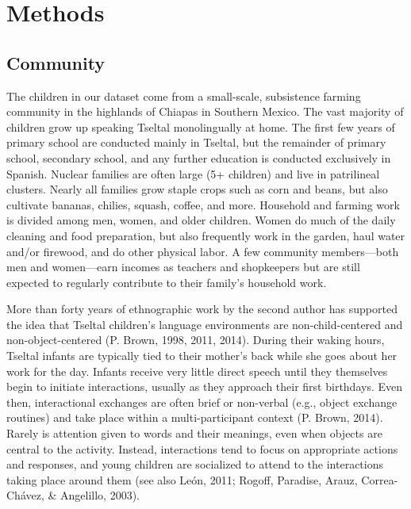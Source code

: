 \documentclass[floatsintext,man]{apa6}
\theoremstyle{definition}
\theoremstyle{definition}
\theoremstyle{definition}
\theoremstyle{remark}
\begin{document}
\hypertarget{methods}{\section{Methods}\label{methods}}

\subsection{Community}\label{methods-community}

The children in our dataset come from a small-scale, subsistence farming
community in the highlands of Chiapas in Southern Mexico. The vast
majority of children grow up speaking Tseltal monolingually at home. The
first few years of primary school are conducted mainly in Tseltal, but
the remainder of primary school, secondary school, and any further
education is conducted exclusively in Spanish. Nuclear families are
often large (5+ children) and live in patrilineal clusters. Nearly all
families grow staple crops such as corn and beans, but also cultivate
bananas, chilies, squash, coffee, and more. Household and farming work
is divided among men, women, and older children. Women do much of the
daily cleaning and food preparation, but also frequently work in the
garden, haul water and/or firewood, and do other physical labor. A few
community members---both men and women---earn incomes as teachers and
shopkeepers but are still expected to regularly contribute to their
family's household work.

More than forty years of ethnographic work by the second author has
supported the idea that Tseltal children's language environments are
non-child-centered and non-object-centered (P. Brown, 1998, 2011, 2014).
During their waking hours, Tseltal infants are typically tied to their
mother's back while she goes about her work for the day. Infants receive
very little direct speech until they themselves begin to initiate
interactions, usually as they approach their first birthdays. Even then,
interactional exchanges are often brief or non-verbal (e.g., object
exchange routines) and take place within a multi-participant context (P.
Brown, 2014). Rarely is attention given to words and their meanings,
even when objects are central to the activity. Instead, interactions
tend to focus on appropriate actions and responses, and young children
are socialized to attend to the interactions taking place around them
(see also León, 2011; Rogoff, Paradise, Arauz, Correa-Chávez, \&
Angelillo, 2003).
\end{document}
